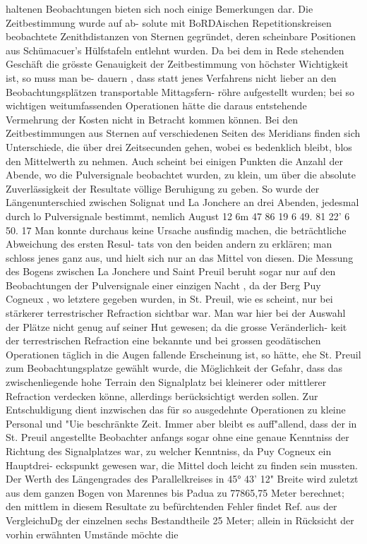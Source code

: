 \documentclass[12pt,a4paper]{article}
\begin{document}
{{{{{{{{haltenen  Beobachtungen  bieten  sich  noch  einige  Bemerkungen  dar.  Die  Zeitbestimmung  wurde  auf  ab- solute mit  BoRDAischen  Repetitionskreisen  beobachtete  Zenithdistanzen  von  Sternen  gegründet,  deren scheinbare  Positionen  aus  Schümacuer's  Hülfstafeln  entlehnt  wurden.  Da  bei  dem  in  Rede  stehenden Geschäft  die  grösste  Genauigkeit  der  Zeitbestimmung  von  höchster  Wichtigkeit  ist,  so  muss  man  be- dauern ,  dass  statt  jenes  Verfahrens  nicht  lieber  an  den  Beobachtungsplätzen  transportable  Mittagsfern- röhre aufgestellt  wurden;  bei  so  wichtigen  weitumfassenden  Operationen  hätte  die  daraus  entstehende Vermehrung  der  Kosten  nicht  in  Betracht  kommen  können.  Bei  den  Zeitbestimmungen  aus  Sternen  auf verschiedenen  Seiten  des  Meridians  finden  sich  Unterschiede,  die  über  drei  Zeitsecunden  gehen,  wobei es  bedenklich  bleibt,  blos  den  Mittelwerth  zu  nehmen.  Auch  scheint  bei  einigen  Punkten  die  Anzahl der  Abende,  wo  die  Pulversignale  beobachtet  wurden,  zu  klein,  um  über  die  absolute  Zuverlässigkeit der  Resultate  völlige  Beruhigung  zu  geben.  So  wurde  der  Längenunterschied  zwischen  Solignat  und  La Jonchere  an  drei  Abenden,  jedesmal  durch  lo  Pulversignale  bestimmt,  nemlich August  12 6m  47  86 19 6     49. 81 22' 6     50.  17 Man  konnte  durchaus  keine  Ursache  ausfindig  machen,  die  beträchtliche  Abweichung  des  ersten  Resul- tats von  den  beiden  andern  zu  erklären;  man  schloss  jenes  ganz  aus,  und  hielt  sich  nur  an  das  Mittel von  diesen.  Die  Messung  des  Bogens  zwischen  La  Jonchere  und  Saint  Preuil  beruht  sogar  nur  auf  den Beobachtungen  der  Pulversignale  einer  einzigen  Nacht ,  da  der  Berg  Puy  Cogneux ,  wo  letztere  gegeben wurden,  in  St.  Preuil,  wie  es  scheint,  nur  bei  stärkerer  terrestrischer  Refraction  sichtbar  war.  Man war  hier  bei  der  Auswahl  der  Plätze  nicht  genug  auf  seiner  Hut  gewesen;  da  die  grosse  Veränderlich- keit der  terrestrischen  Refraction  eine  bekannte  und  bei  grossen  geodätischen  Operationen  täglich  in die  Augen  fallende  Erscheinung  ist,  so  hätte,  ehe  St.  Preuil  zum  Beobachtungsplatze  gewählt  wurde, die  Möglichkeit  der  Gefahr,  dass  das  zwischenliegende  hohe  Terrain  den  Signalplatz  bei  kleinerer  oder mittlerer  Refraction  verdecken  könne,  allerdings  berücksichtigt  werden  sollen.  Zur  Entschuldigung  dient inzwischen  das  für  so  ausgedehnte  Operationen  zu  kleine  Personal  und  "Uie  beschränkte  Zeit.  Immer aber  bleibt  es  auff"allend,  dass  der  in  St.  Preuil  angestellte  Beobachter  anfangs  sogar  ohne  eine  genaue Kenntniss  der  Richtung  des  Signalplatzes  war,  zu  welcher  Kenntniss,  da  Puy  Cogneux  ein  Hauptdrei- eckspunkt gewesen  war,  die  Mittel  doch  leicht  zu  finden  sein  mussten.  Der  Werth  des  Längengrades des  Parallelkreises  in  45°  43'  12"  Breite  wird  zuletzt  aus  dem  ganzen  Bogen  von  Marennes  bis  Padua zu  77865,75  Meter  berechnet;  den  mittlem  in  diesem  Resultate  zu  befürchtenden  Fehler  findet  Ref.  aus der  VergleichuDg  der  einzelnen  sechs  Bestandtheile  25  Meter;  allein  in  Rücksicht  der  vorhin  erwähnten Umstände  möchte  die  }}}}}}}}
\end{document}
